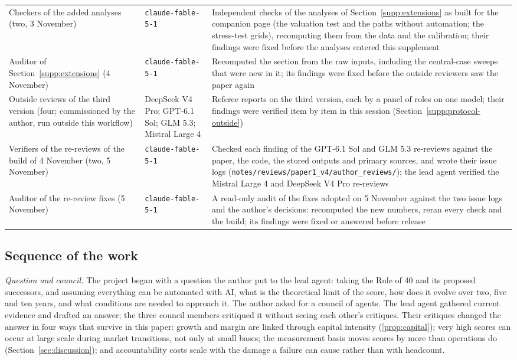 {\begin{longtable}{@{}p{}p{}p{}@{}}
Checkers of the added analyses (two, 3 November) & \texttt{claude-fable-5-1} & Independent checks of the analyses of Section~\ref{supp:extensions} as built for the companion page (the valuation test and the paths without automation; the stress-test grids), recomputing them from the data and the calibration; their findings were fixed before the analyses entered this supplement\\
Auditor of Section~\ref{supp:extensions} (4 November) & \texttt{claude-fable-5-1} & Recomputed the section from the raw inputs, including the central-case sweeps that were new in it; its findings were fixed before the outside reviewers saw the paper again\\
Outside reviews of the third version (four; commissioned by the author, run outside this workflow) & DeepSeek V4 Pro; GPT-6.1 Sol; GLM 5.3; Mistral Large 4 & Referee reports on the third version, each by a panel of roles on one model; their findings were verified item by item in this session (Section~\ref{supp:protocol-outside})\\
Verifiers of the re-reviews of the build of 4 November (two, 5 November) & \texttt{claude-fable-5-1} & Checked each finding of the GPT-6.1 Sol and GLM 5.3 re-reviews against the paper, the code, the stored outputs and primary sources, and wrote their issue logs (\texttt{notes/reviews/paper1\_v4/\allowbreak author\_reviews/}); the lead agent verified the Mistral Large 4 and DeepSeek V4 Pro re-reviews\\
Auditor of the re-review fixes (5 November) & \texttt{claude-fable-5-1} & A read-only audit of the fixes adopted on 5 November against the two issue logs and the author's decisions: recomputed the new numbers, reran every check and the build; its findings were fixed or answered before release\\
\end{longtable}
}

\subsection{Sequence of the work}
\emph{Question and council.} The project began with a question the author put to the lead agent: taking the Rule of 40 and its proposed successors, and assuming everything can be automated with AI, what is the theoretical limit of the score, how does it evolve over two, five and ten years, and what conditions are needed to approach it. The author asked for a council of agents. The lead agent gathered current evidence and drafted an answer; the three council members critiqued it without seeing each other's critiques. Their critiques changed the answer in four ways that survive in this paper: growth and margin are linked through capital intensity (\autoref{prop:capital}); very high scores can occur at large scale during market transitions, not only at small bases; the measurement basis moves scores by more than operations do (Section~\ref{sec:discussion}); and accountability costs scale with the damage a failure can cause rather than with headcount.

